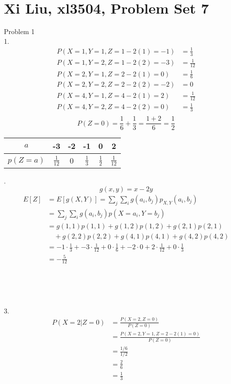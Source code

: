 \documentclass[12pt,border=4pt,multi]{article} %
\begin{document}
\section*{Xi Liu, xl3504, Problem Set 7}
Problem 1\\
1.
\begin{align*}
P(X = 1, Y = 1, Z = 1 - 2(1) = -1) &= \frac{1}{3}\\
P(X = 1, Y = 2, Z = 1 - 2(2) = -3) &= \frac{1}{12}\\
P(X = 2, Y = 1, Z = 2 - 2(1) = 0) &= \frac{1}{6}\\
P(X = 2, Y = 2, Z = 2 - 2(2) = -2) &= 0\\
P(X = 4, Y = 1, Z = 4 - 2(1) = 2) &= \frac{1}{12}\\
P(X = 4, Y = 2, Z = 4 - 2(2) = 0) &= \frac{1}{3}\\
\end{align*}
\[P(Z = 0) = \frac{1}{6} + \frac{1}{3} = \frac{1 + 2}{6} = \frac{1}{2}\]
{\Large
\begin{center}
\begin{tabular}{|c|c|c|c|c|c|}\hline
$a$ & -3 & -2 & -1 & 0 & 2\\ \hline
$p(Z = a)$ & $\frac{1}{12}$ & 0 & $\frac{1}{3}$ & $\frac{1}{2}$ & $\frac{1}{12}$\\ \hline
\end{tabular}
\end{center}
}
\newpage
{}.
\[g(x, y) = x - 2y\]
\begin{align*}
E[Z] &= E[g(X, Y)] = \sum_j \sum_i g(a_i, b_j) p_{X, Y}(a_i, b_j)\\
&= \sum_j \sum_i g(a_i, b_j) p(X = a_i, Y = b_j)\\
&= g(1, 1)p(1, 1) + g(1, 2)p(1, 2) + g(2, 1)p(2, 1)\\
&\quad + g(2, 2)p(2, 2) + g(4, 1)p(4, 1) + g(4, 2)p(4, 2)\\
&= -1 \cdot \frac{1}{3} + -3 \cdot \frac{1}{12} + 0 \cdot \frac{1}{6}
+ -2 \cdot 0 + 2 \cdot \frac{1}{12} + 0 \cdot \frac{1}{3}\\
&= \boxed{-\frac{5}{12}}\\
\end{align*}
\\
\\
\\
\\
3.
\begin{align*}
P(X = 2 | Z = 0) &= \frac{P(X = 2, Z = 0)}{P(Z = 0)}\\
&= \frac{P(X = 2, Y = 1, Z = 2 - 2(1) = 0)}{P(Z = 0)}\\
&= \frac{1/6}{1/2}\\
&= \frac{2}{6}\\
&= \boxed{\frac{1}{3}}\\
\end{align*}
\end{document}
